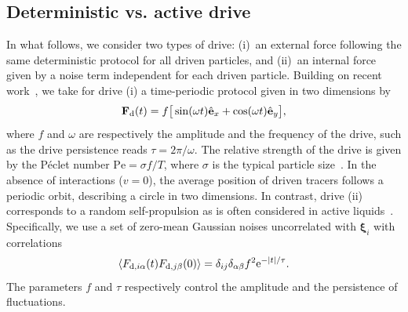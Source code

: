 \documentclass[superscriptaddress, twocolumn, prx, longbibliography, nofootinbib]{revtex4-1}
\begin{document}


\subsection{Deterministic vs. active drive}\label{sec:map}

In what follows, we consider two types of drive: (i)~an external force following the same deterministic protocol for all driven particles, and (ii)~an internal force given by a noise term independent for each driven particle. Building on recent work~\cite{Han2016, delJunco2018}, we take for drive (i) a time-periodic protocol given in two dimensions by
\begin{equation}\label{eq:theta}
	{\bf F}_{\rm d}(t) = f \big[\sin(\omega t) \hat{\bf e}_x + \cos(\omega t)\hat{\bf e}_y \big] ,
\end{equation}
where $f$ and $\omega$ are respectively the amplitude and the frequency of the drive, such as the drive persistence reads $\tau=2\pi/\omega$. The relative strength of the drive is given by the P\'eclet number $\text{Pe} = \sigma f/T$, where $\sigma$ is the typical particle size~\cite{Han2016, delJunco2018}. In the absence of interactions ($v=0$), the average position of driven tracers follows a periodic orbit, describing a circle in two dimensions. In contrast, drive (ii) corresponds to a random self-propulsion as is often considered in active liquids~\cite{Fily2012, Redner2013, Maggi2015}. Specifically, we use a set of zero-mean Gaussian noises uncorrelated with ${\boldsymbol\xi}_i$ with correlations 
\begin{equation}\label{eq:theta_ac}
	\langle F_{{\rm d},i\alpha}(t) F_{{\rm d},j\beta}(0) \rangle = \delta_{ij}\delta_{\alpha\beta} f^2 {\rm e}^{-|t|/\tau} .
\end{equation}
The parameters $f$ and $\tau$ respectively control the amplitude and the persistence of fluctuations.
\end{document}
